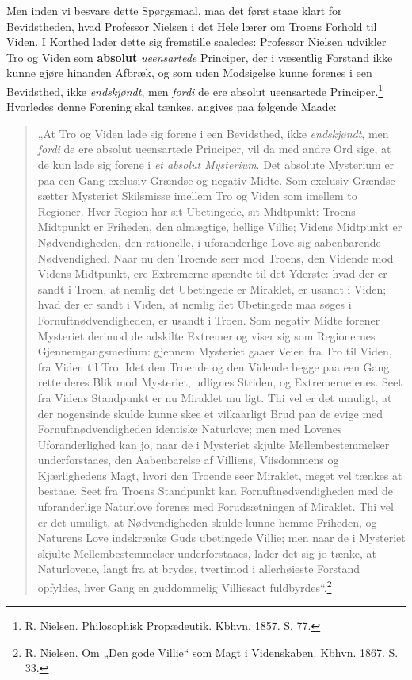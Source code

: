 \documentclass[12pt,a4paper]{book}
\newcommand{\opage}[1]{\marginnote{\footnotesize\textit{[#1]}}}
\begin{document}
Men inden vi besvare dette Spørgsmaal, maa det
først staae klart for Bevidstheden, hvad Professor Nielsen
i det Hele lærer om Troens Forhold til Viden. I
Korthed lader dette sig fremstille saaledes: Professor
Nielsen udvikler Tro og Viden som \textbf{absolut} \emph{ueensartede}
Principer, der i væsentlig Forstand ikke kunne
gjøre hinanden Afbræk, og som uden Modsigelse kunne
forenes i een Bevidsthed, ikke \emph{endskjøndt}, men \emph{fordi}
\opage{11}\setcounter{footnote}{0}%
de ere absolut ueensartede Principer.\footnote{R. Nielsen. Philosophisk Propædeutik. Kbhvn. 1857. S. 77.} Hvorledes denne
Forening skal tænkes, angives paa følgende Maade:
\begin{quote}
„At Tro og Viden lade sig forene i een Bevidsthed,
ikke \emph{endskjøndt}, men \emph{fordi} de ere absolut
ueensartede Principer, vil da med andre Ord sige,
at de kun lade sig forene i \emph{et absolut Mysterium}.
Det absolute Mysterium er paa een Gang
exclusiv Grændse og negativ Midte. Som exclusiv
Grændse sætter Mysteriet Skilsmisse imellem Tro
og Viden som imellem to Regioner. Hver Region
har sit Ubetingede, sit Midtpunkt: Troens Midtpunkt
er Friheden, den almægtige, hellige Villie;
Videns Midtpunkt er Nødvendigheden, den rationelle,
i uforanderlige Love sig aabenbarende Nødvendighed.
Naar nu den Troende seer mod Troens,
den Vidende mod Videns Midtpunkt, ere Extremerne
spændte til det Yderste: hvad der er sandt i
Troen, at nemlig det Ubetingede er Miraklet, er
usandt i Viden; hvad der er sandt i Viden, at
nemlig det Ubetingede maa søges i Fornuftnødvendigheden,
er usandt i Troen. Som negativ Midte
forener Mysteriet derimod de adskilte Extremer og
viser sig som Regionernes Gjennemgangsmedium:
gjennem Mysteriet gaaer Veien fra Tro til Viden,
fra Viden til Tro. Idet den Troende og den Vidende
begge paa een Gang rette deres Blik mod
Mysteriet, udlignes Striden, og Extremerne enes.
Seet fra Videns Standpunkt er nu Miraklet mu%
\opage{12}\setcounter{footnote}{0}%
ligt. Thi vel er det umuligt, at der nogensinde
skulde kunne skee et vilkaarligt Brud paa
de evige med Fornuftnødvendigheden identiske Naturlove;
men med Lovenes Uforanderlighed kan
jo, naar de i Mysteriet skjulte Mellembestemmelser
underforstaaes, den Aabenbarelse af Villiens,
Viisdommens og Kjærlighedens Magt, hvori
den Troende seer Miraklet, meget vel tænkes
at bestaae. Seet fra Troens Standpunkt kan Fornuftnødvendigheden
med de uforanderlige Naturlove
forenes med Forudsætningen af Miraklet. Thi vel
er det umuligt, at Nødvendigheden skulde kunne
hemme Friheden, og Naturens Love indskrænke Guds
ubetingede Villie; men naar de i Mysteriet skjulte
Mellembestemmelser underforstaaes, lader det sig jo
tænke, at Naturlovene, langt fra at brydes, tvertimod
i allerhøieste Forstand opfyldes, hver Gang
en guddommelig Villiesact fuldbyrdes“.\footnote{R. Nielsen. Om „Den gode Villie“ som Magt i Videnskaben. Kbhvn. 1867. S. 33.}
\end{quote}
\end{document}
